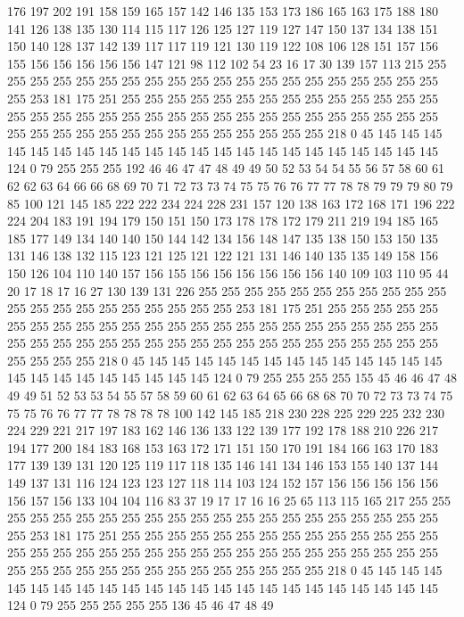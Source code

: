 176 197 202 191 158 159 165 157 142 146 135 153 173 186 165 163 175 188 180 141
126 138 135 130 114 115 117 126 125 127 119 127 147 150 137 134 138 151 150 140
128 137 142 139 117 117 119 121 130 119 122 108 106 128 151 157 156 155 156 156
156 156 156 147 121 98 112 102 54 23 16 17 30 139 157 113 215 255 255 255
255 255 255 255 255 255 255 255 255 255 255 255 255 255 255 255 255 255 253 181
175 251 255 255 255 255 255 255 255 255 255 255 255 255 255 255 255 255 255 255
255 255 255 255 255 255 255 255 255 255 255 255 255 255 255 255 255 255 255 255
255 255 255 255 255 255 255 255 255 218 0 45 145 145 145 145 145 145 145 145
145 145 145 145 145 145 145 145 145 145 145 145 145 145 124 0 79 255 255 255
192 46 46 47 47 48 49 49 50 52 53 54 54 55 56 57 58 60 61 62
62 63 64 66 66 68 69 70 71 72 73 73 74 75 75 76 76 77 77 78
78 79 79 79 80 79 85 100 121 145 185 222 222 234 224 228 231 157 120 138
163 172 168 171 196 222 224 204 183 191 194 179 150 151 150 173 178 178 172 179
211 219 194 185 165 185 177 149 134 140 140 150 144 142 134 156 148 147 135 138
150 153 150 135 131 146 138 132 115 123 121 125 121 122 121 131 146 140 135 135
149 158 156 150 126 104 110 140 157 156 155 156 156 156 156 156 156 140 109 103
110 95 44 20 17 18 17 16 27 130 139 131 226 255 255 255 255 255 255 255
255 255 255 255 255 255 255 255 255 255 255 255 255 255 253 181 175 251 255 255
255 255 255 255 255 255 255 255 255 255 255 255 255 255 255 255 255 255 255 255
255 255 255 255 255 255 255 255 255 255 255 255 255 255 255 255 255 255 255 255
255 255 255 255 255 218 0 45 145 145 145 145 145 145 145 145 145 145 145 145
145 145 145 145 145 145 145 145 145 145 124 0 79 255 255 255 255 155 45 46
46 47 48 49 49 51 52 53 53 54 55 57 58 59 60 61 62 63 64 65
66 68 68 70 70 72 73 73 74 75 75 75 76 76 77 77 78 78 78 78
100 142 145 185 218 230 228 225 229 225 232 230 224 229 221 217 197 183 162 146
136 133 122 139 177 192 178 188 210 226 217 194 177 200 184 183 168 153 163 172
171 151 150 170 191 184 166 163 170 183 177 139 139 131 120 125 119 117 118 135
146 141 134 146 153 155 140 137 144 149 137 131 116 124 123 123 127 118 114 103
124 152 157 156 156 156 156 156 156 157 156 133 104 104 116 83 37 19 17 17
16 16 25 65 113 115 165 217 255 255 255 255 255 255 255 255 255 255 255 255
255 255 255 255 255 255 255 255 255 255 253 181 175 251 255 255 255 255 255 255
255 255 255 255 255 255 255 255 255 255 255 255 255 255 255 255 255 255 255 255
255 255 255 255 255 255 255 255 255 255 255 255 255 255 255 255 255 255 255 255
255 218 0 45 145 145 145 145 145 145 145 145 145 145 145 145 145 145 145 145
145 145 145 145 145 145 124 0 79 255 255 255 255 255 136 45 46 47 48 49
